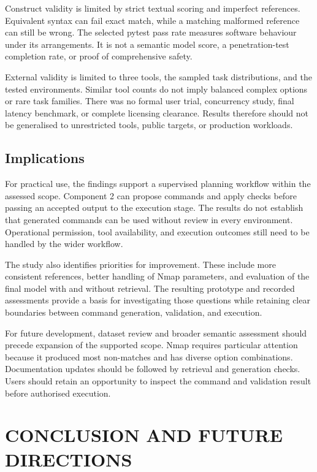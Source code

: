 \documentclass[
]{article}
\begin{document}
Construct validity is limited by strict textual scoring and imperfect
references. Equivalent syntax can fail exact match, while a matching
malformed reference can still be wrong. The selected pytest pass rate
measures software behaviour under its arrangements. It is not a semantic
model score, a penetration-test completion rate, or proof of
comprehensive safety.

External validity is limited to three tools, the sampled task
distributions, and the tested environments. Similar tool counts do not
imply balanced complex options or rare task families. There was no
formal user trial, concurrency study, final latency benchmark, or
complete licensing clearance. Results therefore should not be
generalised to unrestricted tools, public targets, or production
workloads.

\hypertarget{implications}{%
\subsection{\texorpdfstring{
Implications}{ Implications}}\label{implications}}

For practical use, the findings support a supervised planning workflow
within the assessed scope. Component 2 can propose commands and apply
checks before passing an accepted output to the execution stage. The
results do not establish that generated commands can be used without
review in every environment. Operational permission, tool availability,
and execution outcomes still need to be handled by the wider workflow.

The study also identifies priorities for improvement. These include more
consistent references, better handling of Nmap parameters, and
evaluation of the final model with and without retrieval. The resulting
prototype and recorded assessments provide a basis for investigating
those questions while retaining clear boundaries between command
generation, validation, and execution.

For future development, dataset review and broader semantic assessment
should precede expansion of the supported scope. Nmap requires
particular attention because it produced most non-matches and has
diverse option combinations. Documentation updates should be followed by
retrieval and generation checks. Users should retain an opportunity to
inspect the command and validation result before authorised execution.

\hypertarget{conclusion-and-future-directions}{%
\section{CONCLUSION AND FUTURE
DIRECTIONS}\label{conclusion-and-future-directions}}
\end{document}
